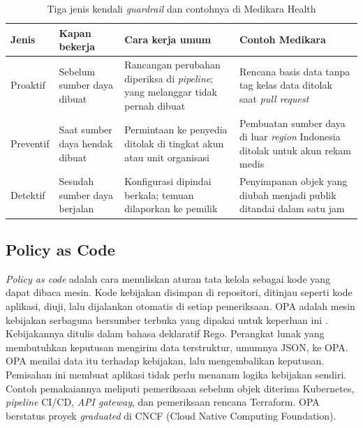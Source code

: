 \begin{table}[!htb]
  \centering
  \caption{Tiga jenis kendali \textit{guardrail} dan contohnya di Medikara Health}
  \label{tab:ch14-jenis-kendali}
  \footnotesize
  \begin{tabularx}{\textwidth}{>{\raggedright\arraybackslash}p{1.9cm}
      >{\raggedright\arraybackslash}p{2.4cm} >{\raggedright\arraybackslash}X
      >{\raggedright\arraybackslash}X}
    \hline
    \textbf{Jenis} & \textbf{Kapan bekerja} & \textbf{Cara kerja umum} & \textbf{Contoh Medikara}
      \\ \hline
    Proaktif & Sebelum sumber daya dibuat & Rancangan perubahan diperiksa di \textit{pipeline};
      yang melanggar tidak pernah dibuat & Rencana basis data tanpa tag kelas data ditolak saat
      \textit{pull request} \\ \hline
    Preventif & Saat sumber daya hendak dibuat & Permintaan ke penyedia ditolak di tingkat akun
      atau unit organisasi & Pembuatan sumber daya di luar \textit{region} Indonesia ditolak untuk
      akun rekam medis \\ \hline
    Detektif & Sesudah sumber daya berjalan & Konfigurasi dipindai berkala; temuan dilaporkan ke
      pemilik & Penyimpanan objek yang diubah menjadi publik ditandai dalam satu jam \\ \hline
  \end{tabularx}
\end{table}

\subsection{Policy as Code}

\textit{Policy as code} adalah cara menuliskan aturan tata kelola sebagai kode yang dapat dibaca
mesin. Kode kebijakan disimpan di repositori, ditinjau seperti kode aplikasi, diuji, lalu dijalankan
otomatis di setiap pemeriksaan. OPA adalah mesin kebijakan serbaguna bersumber terbuka yang dipakai
untuk keperluan ini \cite{c14-opa}. Kebijakannya ditulis dalam bahasa deklaratif Rego. Perangkat
lunak yang membutuhkan keputusan mengirim data terstruktur, umumnya JSON, ke OPA. OPA menilai data
itu terhadap kebijakan, lalu mengembalikan keputusan. Pemisahan ini membuat aplikasi tidak perlu
menanam logika kebijakan sendiri. Contoh pemakaiannya meliputi pemeriksaan sebelum objek diterima
Kubernetes, \textit{pipeline} CI/CD, \textit{API gateway}, dan pemeriksaan rencana Terraform. OPA berstatus proyek \textit{graduated} di CNCF (Cloud
Native Computing Foundation).

